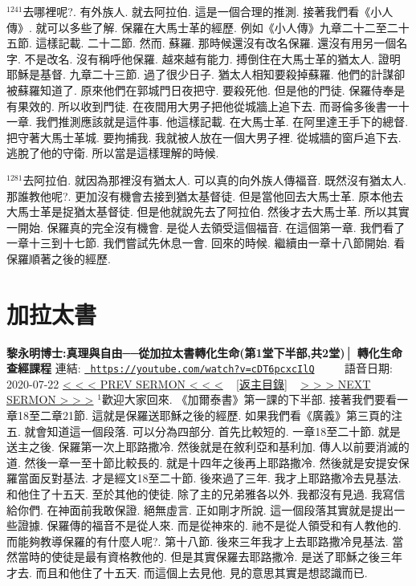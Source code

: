 \documentclass{book}
\begin{document}
$^{1241}$去哪裡呢?.
有外族人.
就去阿拉伯.
這是一個合理的推測.
接著我們看《小人傳》.
就可以多些了解.
保羅在大馬士革的經歷.
例如《小人傳》九章二十二至二十五節.
這樣記載.
二十二節.
然而.
蘇羅.
那時候還沒有改名保羅.
還沒有用另一個名字.
不是改名.
沒有稱呼他保羅.
越來越有能力.
搏倒住在大馬士革的猶太人.
證明耶穌是基督.
九章二十三節.
過了很少日子.
猶太人相知要殺掉蘇羅.
他們的計謀卻被蘇羅知道了.
原來他們在郭城門日夜把守.
要殺死他.
但是他的門徒.
保羅侍奉是有果效的.
所以收到門徒.
在夜間用大男子把他從城牆上追下去.
而哥倫多後書一十一章.
我們推測應該就是這件事.
他這樣記載.
在大馬士革.
在阿里達王手下的總督.
把守著大馬士革城.
要拘捕我.
我就被人放在一個大男子裡.
從城牆的窗戶追下去.
逃脫了他的守衛.
所以當是這樣理解的時候.

$^{1281}$去阿拉伯.
就因為那裡沒有猶太人.
可以真的向外族人傳福音.
既然沒有猶太人.
那誰教他呢?.
更加沒有機會去接到猶太基督徒.
但是當他回去大馬士革.
原本他去大馬士革是捉猶太基督徒.
但是他就說先去了阿拉伯.
然後才去大馬士革.
所以其實一開始.
保羅真的完全沒有機會.
是從人去領受這個福音.
在這個第一章.
我們看了一章十三到十七節.
我們嘗試先休息一會.
回來的時候.
繼續由一章十八節開始.
看保羅順著之後的經歷.
\newpage



\section{加拉太書}
\label{sec:cDT6pcxcIlQ}
\textbf{黎永明博士:真理與自由──從加拉太書轉化生命(第1堂下半部,共2堂)│ 轉化生命查經課程}
\newline
\newline
連結: \href{https://youtube.com/watch?v=cDT6pcxcIlQ}{\texttt{ https://youtube.com/watch?v=cDT6pcxcIlQ}} ~~~~ 語音日期: 2020-07-22 
\newline
\newline
\hyperref[sec:WaZJ_SUMkxc]{\small{< < < PREV SERMON < < <}}
~
\hyperref[sec:index]{\small{[返主目錄]}}
~
\hyperref[sec:rE4H78OZeSY]{\small{> > > NEXT SERMON > > >}}
\newline
\newline
$^{1}$歡迎大家回來.
《加爾泰書》第一課的下半部.
接著我們要看一章18至二章21節.
這就是保羅送耶穌之後的經歷.
如果我們看《廣義》第三頁的注五.
就會知道這一個段落.
可以分為四部分.
首先比較短的.
一章18至二十節.
就是送主之後.
保羅第一次上耶路撒冷.
然後就是在敘利亞和基利加.
傳人以前要消滅的道.
然後一章一至十節比較長的.
就是十四年之後再上耶路撒冷.
然後就是安提安保羅當面反對基法.
才是經文18至二十節.
後來過了三年.
我才上耶路撒冷去見基法.
和他住了十五天.
至於其他的使徒.
除了主的兄弟雅各以外.
我都沒有見過.
我寫信給你們.
在神面前我敢保證.
絕無虛言.
正如剛才所說.
這一個段落其實就是提出一些證據.
保羅傳的福音不是從人來.
而是從神來的.
祂不是從人領受和有人教他的.
而能夠教導保羅的有什麼人呢?.
第十八節.
後來三年我才上去耶路撒冷見基法.
當然當時的使徒是最有資格教他的.
但是其實保羅去耶路撒冷.
是送了耶穌之後三年才去.
而且和他住了十五天.
而這個上去見他.
見的意思其實是想認識而已.
\end{document}
